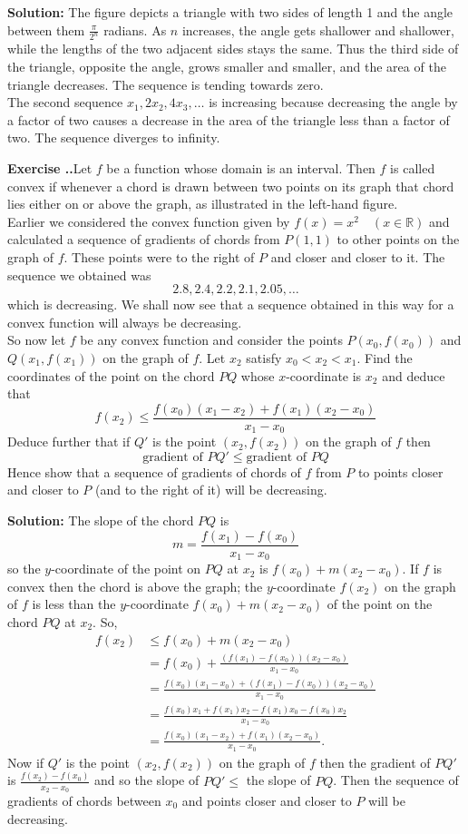 \documentclass{article}
\newcounter{chapter}[section] %
\newcounter{example}[chapter]
\newcommand{\solution}[1]{\setlength{\hangindent}{\parindent} \indent\indent \textbf{Solution: }#1\hfill\break}
\newcommand{\exercise}[1]{
	
	\refstepcounter{example}
    \hangafter=1
    \setlength{\hangindent}{ 
    	\widthof{
			\large\textbf{Exercise \thesection.\thechapter.\theexample\enspace}
    	}-.5\parindent
    }
    {\setlength{\parindent}{0in}\large\textbf{Exercise \thesection.\thechapter.\theexample\enspace}#1}\hfill\break\par
}
\begin{document}
\solution{The figure depicts a triangle with two sides of length 1 and the angle between them $\frac{\pi}{2^n}$ radians. As $n$ increases, the angle gets shallower and shallower, while the lengths of the two adjacent sides stays the same. Thus the third side of the triangle, opposite the angle, grows smaller and smaller, and the area of the triangle decreases. The sequence is tending towards zero. \\
\indent The second sequence $x_1, 2x_2, 4x_3,\dots$ is increasing because decreasing the angle by a factor of two causes a decrease in the area of the triangle less than a factor of two. The sequence diverges to infinity.}%
\exercise{Let $f$ be a function whose domain is an interval. Then $f$ is called convex if whenever a chord is drawn between two points on its graph that chord lies either on or above the graph, as illustrated in the left-hand figure. \\
\indent Earlier we considered the convex function given by $f(x) = x^2\quad (x\in \mathbb{R})$ and calculated a sequence of gradients of chords from $P(1,1)$ to other points on the graph of $f$. These points were to the right of $P$ and closer and closer to it. The sequence we obtained was $$2.8, 2.4, 2.2, 2.1, 2.05,\dots$$ which is decreasing. We shall now see that a sequence obtained in this way for a convex function will always be decreasing. \\
\indent So now let $f$ be any convex function and consider the points $P(x_0, f(x_0))$ and $Q(x_1, f(x_1))$ on the graph of $f$. Let $x_2$ satisfy $x_0 < x_2 < x_1$. Find the coordinates of the point on the chord $PQ$ whose $x$-coordinate is $x_2$ and deduce that 
$$f(x_2) \leqslant \frac{f(x_0)(x_1-x_2) + f(x_1)(x_2-x_0)}{x_1-x_0}$$ 
Deduce further that if $Q'$ is the point $(x_2, f(x_2))$ on the graph of $f$ then 
$$\text{gradient of }PQ' \leqslant \text{gradient of }PQ$$
Hence show that a sequence of gradients of chords of $f$ from $P$ to points closer and closer to $P$ (and to the right of it) will be decreasing.}
\solution{The slope of the chord $PQ$ is 
$$m = \frac{f(x_1) - f(x_0)}{x_1-x_0}$$
so the $y$-coordinate of the point on $PQ$ at $x_2$ is $f(x_0) + m(x_2-x_0)$. If $f$ is convex then the chord is above the graph; the $y$-coordinate $f(x_2)$ on the graph of $f$ is less than the $y$-coordinate $f(x_0) + m(x_2-x_0)$ of the point on the chord $PQ$ at $x_2$. So, 
\begin{align*}
f(x_2) &\leqslant f(x_0) + m(x_2-x_0)\\ 
&= f(x_0) + \frac{(f(x_1)-f(x_0))(x_2-x_0)}{x_1-x_0}\\
&=\frac{f(x_0)(x_1-x_0) + (f(x_1) - f(x_0))(x_2-x_0)}{x_1-x_0}\\
&= \frac{f(x_0)x_1 + f(x_1)x_2 - f(x_1)x_0 - f(x_0)x_2}{x_1-x_0}\\
&= \frac{f(x_0)(x_1-x_2) + f(x_1)(x_2-x_0)}{x_1-x_0}.
\end{align*}
\indent Now if $Q'$ is the point $(x_2, f(x_2))$ on the graph of $f$ then the gradient of $PQ'$ is $\frac{f(x_2) - f(x_0)}{x_2-x_0}$ and so the slope of $PQ' \leq$ the slope of $PQ$. Then the sequence of gradients of chords between $x_0$ and points closer and closer to $P$ will be decreasing.}%
\end{document}
